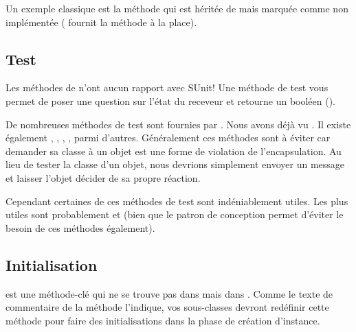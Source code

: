 \documentclass[a4paper,10pt,twoside]{book}
\begin{document}
Un exemple classique est la méthode  qui est héritée 
de  mais marquée comme non implémentée ( fournit 
la méthode  à la place).



\subsection{Test}

Les méthodes de  n'ont aucun rapport avec SUnit! Une méthode de test vous 
permet de poser une question sur l'état du receveur et retourne un booléen ().

De nombreuses méthodes de test sont fournies par . Nous
avons déjà vu . Il existe également
, ,
, , parmi
d'autres. Généralement ces méthodes sont à éviter car
demander sa classe à un objet est une forme de violation de
l'encapsulation. Au lieu de tester la classe d'un objet, nous devrions
simplement envoyer un message et laisser l'objet décider de sa propre réaction.

Cependant certaines de ces méthodes de test sont indéniablement utiles. Les plus utiles sont probablement  et  (bien que le patron de conception \cite{Wool98a} permet d'éviter le besoin de ces méthodes également).


\subsection{Initialisation}
 est une méthode-clé qui ne se
trouve pas dans  mais dans .
Comme le texte de commentaire de la méthode l'indique, vos sous-classes
devront redéfinir cette méthode pour faire des initialisations
dans la phase de création d'instance.
\end{document}
